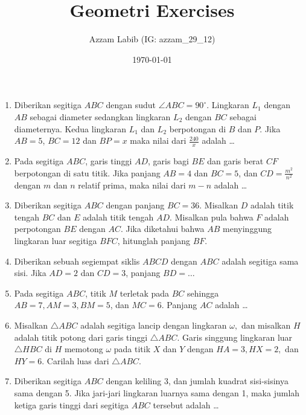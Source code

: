 \documentclass[12pt]{scrartcl}
\title{Geometri Exercises}
\author{Azzam Labib (IG: azzam\_29\_12)}
\date{\today}
\begin{document}
\maketitle

\renewcommand*\contentsname{Daftar Isi}
\tableofcontents

\newpage

\begin{enumerate}
    \item Diberikan segitiga $ABC$ dengan sudut $\angle ABC = 90^\circ$. Lingkaran $L_1$ dengan $AB$ sebagai diameter sedangkan lingkaran $L_2$ dengan $BC$ sebagai diameternya. Kedua lingkaran $L_1$ dan $L_2$ berpotongan di $B$ dan $P$. Jika $AB = 5$, $BC = 12$ dan $BP = x$ maka nilai dari $\frac{240}{x}$ adalah \ldots
    
    \item Pada segitiga $ABC$, garis tinggi $AD$, garis bagi $BE$ dan garis berat $CF$ berpotongan di satu titik. Jika panjang $AB = 4$ dan $BC = 5$, dan $CD = \frac{m^2}{n^2}$ dengan $m$ dan $n$ relatif prima, maka nilai dari $m - n$ adalah \ldots

    \item Diberikan segitiga $ABC$ dengan panjang $BC = 36$. Misalkan $D$ adalah titik tengah $BC$ dan $E$ adalah titik tengah $AD$. Misalkan pula bahwa $F$ adalah perpotongan $BE$ dengan $AC$. Jika diketahui bahwa $AB$ menyinggung lingkaran luar segitiga $BFC$, hitunglah panjang $BF$.

    \item Diberikan sebuah segiempat siklis $ABCD$ dengan $ABC$ adalah segitiga sama sisi. Jika $AD=2$ dan $CD=3$, panjang $BD=\dots$

    \item Pada segitiga $ABC$, titik $M$ terletak pada $BC$ sehingga $AB=7, AM=3, BM=5$, dan $MC=6$. Panjang $AC$ adalah \dots

    \item Misalkan $\triangle ABC$ adalah segitiga lancip dengan lingkaran $\omega,$ dan misalkan $H$ adalah titik potong dari garis tinggi $\triangle ABC.$ Garis singgung lingkaran luar $\triangle HBC$ di $H$ memotong $\omega$ pada titik $X$ dan $Y$ dengan $HA=3,HX=2,$ dan $HY=6.$ Carilah luas dari $\triangle ABC$.

    \item Diberikan segitiga $ABC$ dengan keliling 3, dan jumlah kuadrat sisi-sisinya sama dengan 5. Jika jari-jari lingkaran luarnya sama dengan 1, maka jumlah ketiga garis tinggi dari segitiga $ABC$ tersebut adalah \dots


\end{enumerate}
\end{document}
